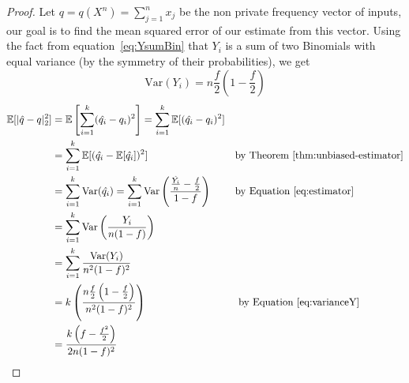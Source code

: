 \documentclass{article}
\begin{document}
\begin{enumerate}
\begin{proof}
Let $q = q(X^n)=\sum\limits_{j=1}^n x_j$ be the non private frequency vector of inputs, our goal is to find the mean squared error of our estimate from this vector. Using the fact from equation~\ref{eq:YsumBin} that $Y_i$ is a sum of two Binomials with equal variance (by the symmetry of their probabilities), we get
\begin{equation}
\label{eq:varianceY}
    \text{Var}(Y_i)=n\frac{f}{2}\left(1-\frac{f}{2}\right)
\end{equation}
	\begin{align*}
		\mathbb{E}[|\hat{q}-q|_2^2] &= \mathbb{E}\left[\sum\limits_{i=1}^k(\hat{q_i}-q_i)^2\right] = \sum\limits_{i=1}^k\mathbb{E}[(\hat{q_i}-q_i)^2] &&\\
			&= \sum\limits_{i=1}^k\mathbb{E}[(\hat{q_i}-\mathbb{E}[\hat{q_i}])^2] && \text{by Theorem~\ref{thm:unbiased-estimator}}\\
			&= \sum\limits_{i=1}^k\text{Var}(\hat{q_i}) = \sum\limits_{i=1}^k\text{Var}\left(\frac{\frac{\hat{Y_i}}{n}-\frac{f}{2}}{1-f}\right)&&\text{by Equation~\ref{eq:estimator}}\\
			&= \sum\limits_{i=1}^k\text{Var}\left(\frac{Y_i}{n(1-f)}\right) &&\\
			&= \sum\limits_{i=1}^k\frac{\text{Var}(Y_i)}{n^2(1-f)^2}&&\\
			&= k\left(\frac{n\frac{f}{2}\left(1-\frac{f}{2}\right)}{n^2(1-f)^2}\right) &&\text{ by Equation~\ref{eq:varianceY}}\\
			& = \frac{k\left(f-\frac{f^2}{2}\right)}{2n(1-f)^2}&&
	\end{align*}
	
\end{proof}
\end{enumerate}



\end{document}
